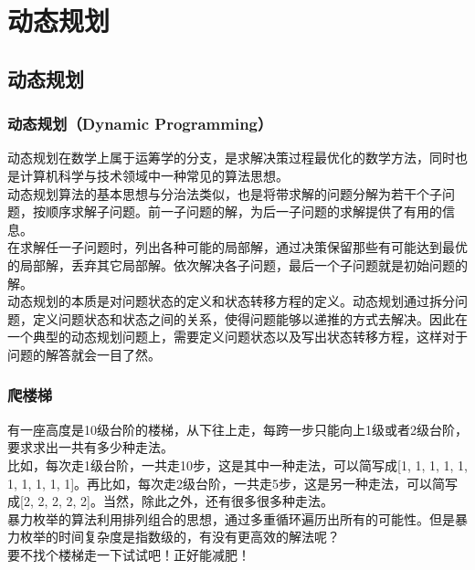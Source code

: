 \chapter{动态规划}

\section{动态规划}

\subsection{动态规划（Dynamic Programming）}

动态规划在数学上属于运筹学的分支，是求解决策过程最优化的数学方法，同时也是计算机科学与技术领域中一种常见的算法思想。\\

动态规划算法的基本思想与分治法类似，也是将带求解的问题分解为若干个子问题，按顺序求解子问题。前一子问题的解，为后一子问题的求解提供了有用的信息。\\

在求解任一子问题时，列出各种可能的局部解，通过决策保留那些有可能达到最优的局部解，丢弃其它局部解。依次解决各子问题，最后一个子问题就是初始问题的解。\\

动态规划的本质是对问题状态的定义和状态转移方程的定义。动态规划通过拆分问题，定义问题状态和状态之间的关系，使得问题能够以递推的方式去解决。因此在一个典型的动态规划问题上，需要定义问题状态以及写出状态转移方程，这样对于问题的解答就会一目了然。\\

\subsection{爬楼梯}

有一座高度是10级台阶的楼梯，从下往上走，每跨一步只能向上1级或者2级台阶，要求求出一共有多少种走法。\\

比如，每次走1级台阶，一共走10步，这是其中一种走法，可以简写成[1, 1, 1, 1, 1, 1, 1, 1, 1, 1]。再比如，每次走2级台阶，一共走5步，这是另一种走法，可以简写成[2, 2, 2, 2, 2]。当然，除此之外，还有很多很多种走法。\\

暴力枚举的算法利用排列组合的思想，通过多重循环遍历出所有的可能性。但是暴力枚举的时间复杂度是指数级的，有没有更高效的解法呢？\\

要不找个楼梯走一下试试吧！正好能减肥！\\


